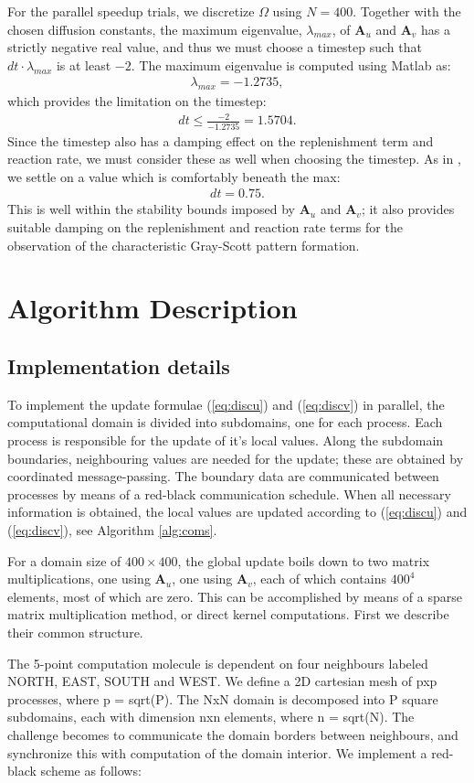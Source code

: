 \documentclass[a4paper,11pt]{article}
\newcommand{\ba}[1]{\begin{align*}    #1    \end{align*}}
\renewcommand{\vec}[1]{\mathbf{#1}}
\begin{document}
For the parallel speedup trials, we discretize $\Omega$ using $N = 400$.  Together with the chosen diffusion constants, the  maximum eigenvalue, $\lambda_{max}$, of $\vec{A}_u$ and $\vec{A}_v$ has a strictly negative real value, and thus we must choose a timestep such that $dt \cdot \lambda_{max}$ is at least $-2$.  The maximum eigenvalue is computed using Matlab as:
\ba{
\lambda_{max} = -1.2735,
}
which provides the limitation on the timestep:
\ba{
dt \le \frac{-2}{-1.2735} = 1.5704.
}
Since the timestep also has a damping effect on the replenishment term and reaction rate, we must consider these as well when choosing the timestep.  As in \cite{Wang}, we settle on a value which is comfortably beneath the max:
\ba{
dt = 0.75.
}
This is well within the stability bounds imposed by $\vec{A}_u$ and $\vec{A}_v$; it also provides suitable damping on the replenishment and reaction rate terms for the observation of the characteristic Gray-Scott pattern formation.

\section*{Algorithm Description}
\subsection*{Implementation details}
To implement the update formulae (\ref{eq:discu}) and (\ref{eq:discv}) in parallel, the computational domain is divided into subdomains, one for each process.  Each process is responsible for the update of it's local values.  Along the subdomain boundaries, neighbouring values are needed for the update; these are obtained by coordinated message-passing.  The boundary data are communicated between processes by means of a red-black communication schedule.  When all necessary information is obtained, the local values are updated according to (\ref{eq:discu}) and (\ref{eq:discv}), see Algorithm \ref{alg:coms}.

For a domain size of $400 \times 400$, the global update boils down to two matrix multiplications, one using $\vec{A}_u$, one using $\vec{A}_v$, each of which contains $400^4$ elements, most of which are zero.  This can be accomplished by means of a sparse matrix multiplication method, or direct kernel computations. First we describe their common structure.

The 5-point computation molecule is dependent on four neighbours labeled NORTH, EAST, SOUTH and WEST. We define a 2D cartesian mesh of pxp processes, where p = sqrt(P). The NxN domain is decomposed into P square subdomains, each with dimension nxn elements, where n = sqrt(N). The challenge becomes to communicate the domain borders between neighbours, and synchronize this with computation of the domain interior. We implement a red-black scheme as follows:
\end{document}
